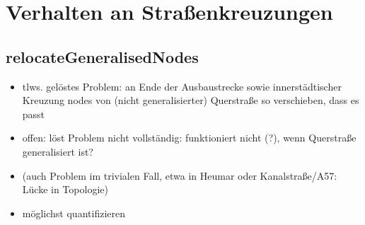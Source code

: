 \documentclass[../main/thesis.tex]{subfiles}
\begin{document}
\section{Verhalten an Straßenkreuzungen}

\subsection{relocateGeneralisedNodes}

\begin{itemize}
\item tlws. gelöstes Problem: an Ende der Ausbaustrecke sowie innerstädtischer Kreuzung nodes von (nicht generalisierter) Querstraße so verschieben, dass es passt
\item offen: löst Problem nicht vollständig: funktioniert nicht (?), wenn Querstraße generalisiert ist?
\item (auch Problem im trivialen Fall, etwa in Heumar oder Kanalstraße/A57: Lücke in Topologie)
\item möglichst quantifizieren
\end{itemize}


\end{document}

